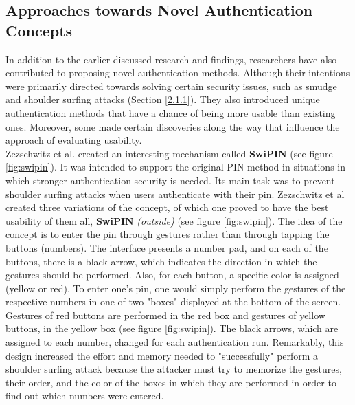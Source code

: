 \subsection{Approaches towards Novel Authentication Concepts}
In addition to the earlier discussed research and findings, researchers have also contributed to proposing novel authentication methods. Although their intentions were primarily directed towards solving certain security issues, such as smudge and shoulder surfing attacks (Section \ref{2.1.1}). They also introduced unique authentication methods that have a chance of being more usable than existing ones. Moreover, some made certain discoveries along the way that influence the approach of evaluating usability.\\

Zezschwitz et al. \cite{Swipin} created an interesting mechanism called \textbf{SwiPIN} (see figure \ref{fig:swipin}). It was intended to support the original PIN method in situations in which stronger authentication security is needed. Its main task was to prevent shoulder surfing attacks when users authenticate with their pin. Zezschwitz et al \cite{Swipin} created three variations of the concept, of which one proved to have the best usability of them all, \textbf{SwiPIN} \textit{(outside)} (see figure \ref{fig:swipin}). The idea of the concept is to enter the pin through gestures rather than through tapping the buttons (numbers). The interface presents a number pad, and on each of the buttons, there is a black arrow, which indicates the direction in which the gestures should be performed. Also, for each button, a specific color is assigned (yellow or red). To enter one's pin, one would simply perform the gestures of the respective numbers in one of two "boxes" displayed at the bottom of the screen. Gestures of red buttons are performed in the red box and gestures of yellow buttons, in the yellow box (see figure \ref{fig:swipin}). The black arrows, which are assigned to each number, changed for each authentication run. Remarkably, this design increased the effort and memory needed to "successfully" perform a shoulder surfing attack because the attacker must try to memorize the gestures, their order, and the color of the boxes in which they are performed in order to find out which numbers were entered. \\

